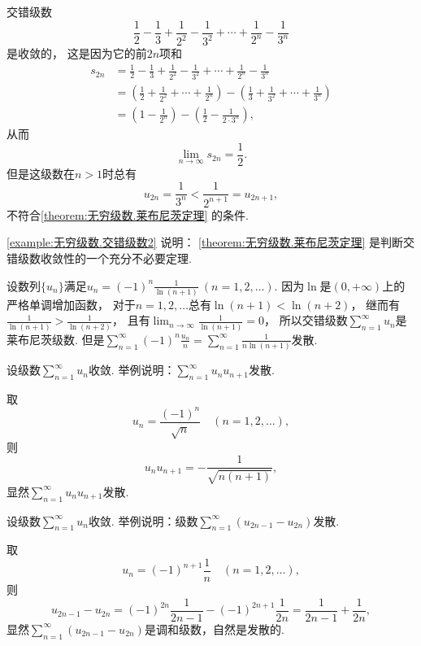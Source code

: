 \begin{example}\label{example:无穷级数.交错级数2}
交错级数\[
	\frac{1}{2} - \frac{1}{3}
	+ \frac{1}{2^2} - \frac{1}{3^2}
	+ \dotsm + \frac{1}{2^n} - \frac{1}{3^n}
\]是收敛的，
这是因为它的前\(2n\)项和\begin{align*}
	s_{2n} &= \frac{1}{2} - \frac{1}{3}
	+ \frac{1}{2^2} - \frac{1}{3^2}
	+ \dotsm + \frac{1}{2^n} - \frac{1}{3^n} \\
	&= \left(\frac{1}{2} + \frac{1}{2^2} + \dotsm + \frac{1}{2^n}\right)
	- \left(\frac{1}{3} + \frac{1}{3^2} + \dotsm + \frac{1}{3^n}\right) \\
	&= \left(1 - \frac{1}{2^n}\right)
	- \left(\frac{1}{2} - \frac{1}{2\cdot3^n}\right),
\end{align*}
从而\[
	\lim_{n\to\infty} s_{2n} = \frac{1}{2}.
\]
但是这级数在\(n>1\)时总有\[
	u_{2n} = \frac{1}{3^n} < \frac{1}{2^{n+1}} = u_{2n+1},
\]不符合\cref{theorem:无穷级数.莱布尼茨定理} 的条件.
\end{example}
\begin{remark}
\cref{example:无穷级数.交错级数2} 说明：
\cref{theorem:无穷级数.莱布尼茨定理} 是判断交错级数收敛性的一个充分不必要定理.
\end{remark}

\begin{example}
设数列\(\{u_n\}\)满足\(u_n = (-1)^n \frac1{\ln(n+1)}\ (n=1,2,\dotsc)\).
因为\(\ln\)是\((0,+\infty)\)上的严格单调增加函数，
对于\(n=1,2,\dotsc\)总有\(\ln(n+1) < \ln(n+2)\)，
继而有\(\frac1{\ln(n+1)} > \frac1{\ln(n+2)}\)，
且有\(\lim_{n\to\infty} \frac1{\ln(n+1)} = 0\)，
所以交错级数\(\sum_{n=1}^\infty u_n\)是莱布尼茨级数.
但是\(\sum_{n=1}^\infty (-1)^n \frac{u_n}{n}
= \sum_{n=1}^\infty \frac1{n \ln(n+1)}\)发散.
\end{example}

\begin{example}
设级数\(\sum_{n=1}^\infty u_n\)收敛.
举例说明：\(\sum_{n=1}^\infty u_n u_{n+1}\)发散.
\begin{solution}
取\[
	u_n = \frac{(-1)^n}{\sqrt{n}}
	\quad(n=1,2,\dotsc),
\]
则\[
	u_n u_{n+1}
	= -\frac1{\sqrt{n(n+1)}},
\]
显然\(\sum_{n=1}^\infty u_n u_{n+1}\)发散.
\end{solution}
\end{example}

\begin{example}
设级数\(\sum_{n=1}^\infty u_n\)收敛.
举例说明：级数\(\sum_{n=1}^\infty (u_{2n-1} - u_{2n})\)发散.
\begin{solution}
取\[
	u_n = (-1)^{n+1} \frac1n
	\quad(n=1,2,\dotsc),
\]
则\[
	u_{2n-1} - u_{2n}
	= (-1)^{2n} \frac1{2n-1} - (-1)^{2n+1} \frac1{2n}
	= \frac1{2n-1} + \frac1{2n},
\]
显然\(\sum_{n=1}^\infty (u_{2n-1} - u_{2n})\)是调和级数，自然是发散的.
\end{solution}
\end{example}

